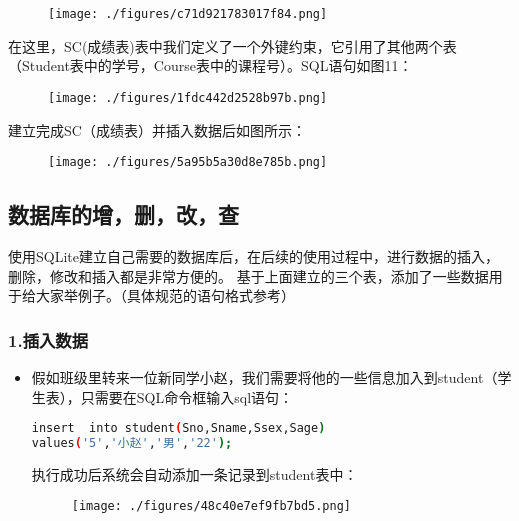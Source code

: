 \begin{figure}[ht]
\centering
\texttt{[image: ./figures/c71d921783017f84.png]}
\caption{} \label{fig_SQLint_10}
\end{figure}

在这里，SC(成绩表)表中我们定义了一个外键约束，它引用了其他两个表（Student表中的学号，Course表中的课程号）。SQL语句如图11：
\begin{figure}[ht]
\centering
\texttt{[image: ./figures/1fdc442d2528b97b.png]}
\caption{} \label{fig_SQLint_11}
\end{figure}

建立完成SC（成绩表）并插入数据后如图所示：
\begin{figure}[ht]
\centering
\texttt{[image: ./figures/5a95b5a30d8e785b.png]}
\caption{} \label{fig_SQLint_12}
\end{figure}

\subsection{数据库的增，删，改，查}
使用SQLite建立自己需要的数据库后，在后续的使用过程中，进行数据的插入，删除，修改和插入都是非常方便的。
基于上面建立的三个表，添加了一些数据用于给大家举例子。（具体规范的语句格式参考）
\subsubsection{1.插入数据}

\begin{itemize}
\item 假如班级里转来一位新同学小赵，我们需要将他的一些信息加入到student（学生表），只需要在SQL命令框输入sql语句：

\begin{lstlisting}[language=bash]
insert  into student(Sno,Sname,Ssex,Sage)
values('5','小赵','男','22');
\end{lstlisting}
执行成功后系统会自动添加一条记录到student表中：
\begin{figure}[ht]
\centering
\texttt{[image: ./figures/48c40e7ef9fb7bd5.png]}
\caption{} \label{fig_SQLint_13}
\end{figure}
\end{itemize}

